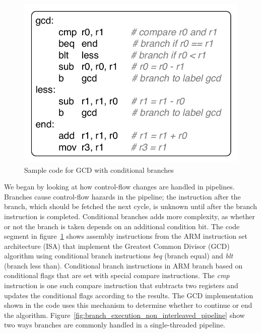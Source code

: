 \begin{figure}
  \vspace{-20pt}
  \begin{center}
    \includegraphics[scale=.65]{figs/sample_gcd_code}
  \end{center}
  \vspace{-20pt}
  \caption{Sample code for GCD with conditional branches}
  \label{fig:sample_gcd_code}
\end{figure}
We began by looking at how control-flow changes are handled in pipelines.
Branches cause control-flow hazards in the pipeline; the instruction after the branch, which should be fetched the next cycle, is unknown until after the branch instruction is completed.
Conditional branches adds more complexity, as whether or not the branch is taken depends on an additional condition bit. 
The code segment in figure~\ref{fig:sample_gcd_code} shows assembly instructions from the ARM instruction set architecture (ISA) that implement the Greatest Common Divisor (GCD) algorithm using conditional branch instructions \emph{beq} (branch equal) and \emph{blt} (branch less than).  
Conditional branch instructions in ARM branch based on conditional flags that are set with special compare instructions.
The \emph{cmp} instruction is one such compare instruction that subtracts two registers and updates the conditional flags according to the results.
The GCD implementation shown in the code uses this mechanism to determine whether to continue or end the algorithm.
Figure~\ref{fig:branch_execution_non_interleaved_pipeline} show two ways branches are commonly handled in a single-threaded pipeline. 

